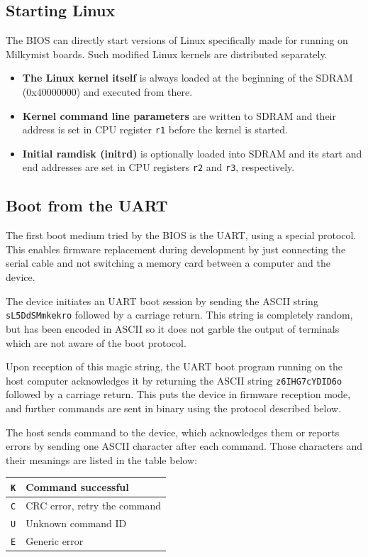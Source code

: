 \documentclass[a4paper,11pt]{article}
\begin{document}
\subsection{Starting Linux}
The BIOS can directly start versions of Linux specifically made for running on Milkymist boards. Such modified Linux kernels are distributed separately.

\begin{itemize}
\item \textbf{The Linux kernel itself} is always loaded at the beginning of the SDRAM (0x40000000) and executed from there.
\item \textbf{Kernel command line parameters} are written to SDRAM and their address is set in CPU register \verb!r1! before the kernel is started.
\item \textbf{Initial ramdisk (initrd)} is optionally loaded into SDRAM and its start and end addresses are set in CPU registers \verb!r2! and \verb!r3!, respectively.
\end{itemize}

\subsection{Boot from the UART}
The first boot medium tried by the BIOS is the UART, using a special protocol. This enables firmware replacement during development by just connecting the serial cable and not switching a memory card between a computer and the device.

The device initiates an UART boot session by sending the ASCII string \verb!sL5DdSMmkekro! followed by a carriage return. This string is completely random, but has been encoded in ASCII so it does not garble the output of terminals which are not aware of the boot protocol.

Upon reception of this magic string, the UART boot program running on the host computer acknowledges it by returning the ASCII string \verb!z6IHG7cYDID6o! followed by a carriage return. This puts the device in firmware reception mode, and further commands are sent in binary using the protocol described below.

The host sends command to the device, which acknowledges them or reports errors by sending one ASCII character after each command. Those characters and their meanings are listed in the table below:\\

\begin{tabular}{|l|l|}
\hline
\verb!K! & Command successful \\
\hline
\verb!C! & CRC error, retry the command \\
\hline
\verb!U! & Unknown command ID \\
\hline
\verb!E! & Generic error \\
\hline
\end{tabular}\\
\end{document}
